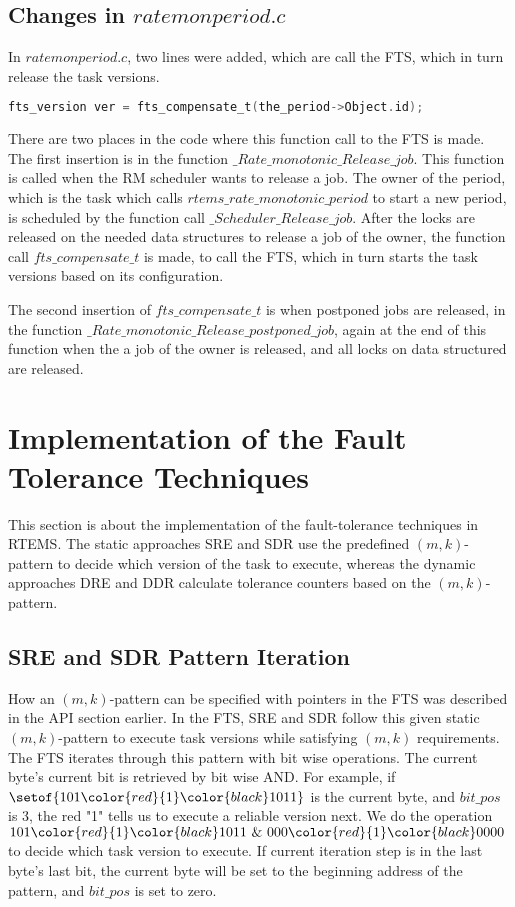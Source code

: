 \subsection{Changes in $ratemonperiod.c$}
In $ratemonperiod.c$, two lines were added, which are call the FTS, which in turn release the task versions.
\begin{lstlisting}[language=C]
fts_version ver = fts_compensate_t(the_period->Object.id);
\end{lstlisting}
There are two places in the code where this function call to the FTS is made. The first insertion is in the function $\_Rate\_monotonic\_Release\_job$. This function is called when the RM scheduler wants to release a job. The owner of the period, which is the task which calls $rtems\_rate\_monotonic\_period$ to start a new period, is scheduled by the function call $\_Scheduler\_Release\_job$. After the locks are released on the needed data structures to release a job of the owner, the function call $fts\_compensate\_t$ is made, to call the FTS, which in turn starts the task versions based on its configuration.

The second insertion of $fts\_compensate\_t$ is when postponed jobs are released, in the function $\_Rate\_monotonic\_Release\_postponed\_job$, again at the end of this function when the a job of the owner is released, and all locks on data structured are released.

\section{Implementation of the Fault Tolerance Techniques}
This section is about the implementation of the fault-tolerance techniques in RTEMS. The static approaches SRE and SDR use the predefined $(m,k)$-pattern to decide which version of the task to execute, whereas the dynamic approaches DRE and DDR calculate tolerance counters based on the $(m,k)$-pattern.

\subsection{SRE and SDR Pattern Iteration}
How an $(m,k)$-pattern can be specified with pointers in the FTS was described in the API section earlier. In the FTS, SRE and SDR follow this given static $(m,k)$-pattern to execute task versions while satisfying $(m,k)$ requirements. 
The FTS iterates through this pattern with bit wise operations. The current byte's current bit is retrieved by bit wise AND. For example, if $\setof{101\color{red}{1}\color{black}1011}$ is the current byte, and $bit\_pos$ is 3, the red "1" tells us  to execute a reliable version next. We do the operation
$101\color{red}{1}\color{black}1011~\&~000\color{red}{1}\color{black}0000$ to decide which task version to execute.
If current iteration step is in the last byte's last bit, the current byte will be set to the beginning address of the pattern, and $bit\_pos$ is set to zero.

